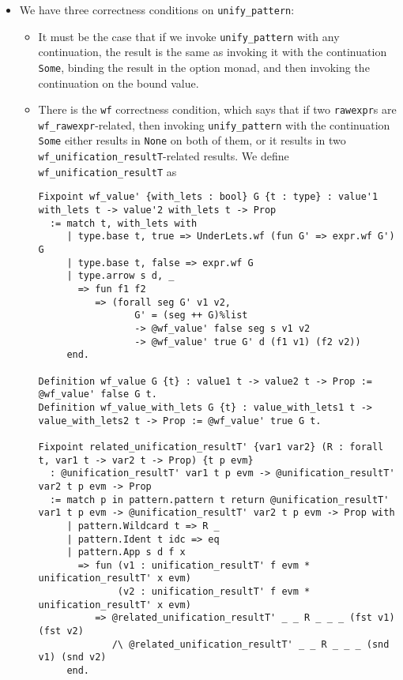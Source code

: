 \begin{itemize}
\begin{itemize}
\begin{itemize}
      \begin{itemize}
      \tightlist
      \item
        We have three correctness conditions on
        \texttt{unify\_pattern\textquotesingle{}}:

        \begin{itemize}
        \item
          It must be the case that if we invoke
          \texttt{unify\_pattern\textquotesingle{}} with any
          continuation, the result is the same as invoking it with the
          continuation \texttt{Some}, binding the result in the option
          monad, and then invoking the continuation on the bound value.
        \item
          There is the \texttt{wf} correctness condition, which says
          that if two \texttt{rawexpr}s are
          \texttt{wf\_rawexpr}-related, then invoking
          \texttt{unify\_pattern\textquotesingle{}} with the
          continuation \texttt{Some} either results in \texttt{None} on
          both of them, or it results in two
          \texttt{wf\_unification\_resultT\textquotesingle{}}-related
          results. We define
          \texttt{wf\_unification\_resultT\textquotesingle{}} as

\begin{verbatim}
Fixpoint wf_value' {with_lets : bool} G {t : type} : value'1 with_lets t -> value'2 with_lets t -> Prop
  := match t, with_lets with
     | type.base t, true => UnderLets.wf (fun G' => expr.wf G') G
     | type.base t, false => expr.wf G
     | type.arrow s d, _
       => fun f1 f2
          => (forall seg G' v1 v2,
                 G' = (seg ++ G)%list
                 -> @wf_value' false seg s v1 v2
                 -> @wf_value' true G' d (f1 v1) (f2 v2))
     end.

Definition wf_value G {t} : value1 t -> value2 t -> Prop := @wf_value' false G t.
Definition wf_value_with_lets G {t} : value_with_lets1 t -> value_with_lets2 t -> Prop := @wf_value' true G t.

Fixpoint related_unification_resultT' {var1 var2} (R : forall t, var1 t -> var2 t -> Prop) {t p evm}
  : @unification_resultT' var1 t p evm -> @unification_resultT' var2 t p evm -> Prop
  := match p in pattern.pattern t return @unification_resultT' var1 t p evm -> @unification_resultT' var2 t p evm -> Prop with
     | pattern.Wildcard t => R _
     | pattern.Ident t idc => eq
     | pattern.App s d f x
       => fun (v1 : unification_resultT' f evm * unification_resultT' x evm)
              (v2 : unification_resultT' f evm * unification_resultT' x evm)
          => @related_unification_resultT' _ _ R _ _ _ (fst v1) (fst v2)
             /\ @related_unification_resultT' _ _ R _ _ _ (snd v1) (snd v2)
     end.


\end{verbatim}
\end{itemize}
\end{itemize}
\end{itemize}
\end{itemize}
\end{itemize}
